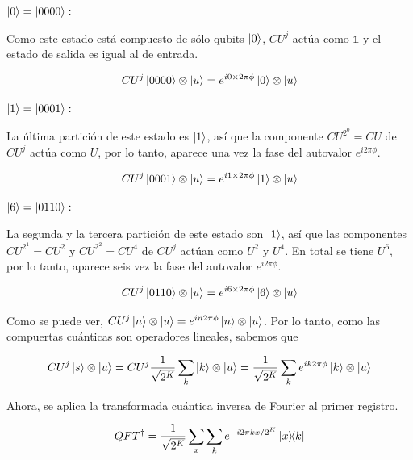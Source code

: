 $\ket{0} = \ket{0000}:$

Como este estado está compuesto de sólo qubits $\ket{0}$, $CU^j$ actúa como $\mathds{1}$ y el estado de salida es igual al de entrada.

\begin{equation}
    CU^j \ket{0000} \otimes \ket{u} = e^{i 0 \times 2\pi \phi} \ket{0} \otimes \ket{u}
\end{equation}

$\ket{1} = \ket{0001}:$

La última partición de este estado es $\ket{1}$, así que la componente $CU^{2^0} = CU$ de $CU^j$ actúa como $U$, por lo tanto, aparece una vez la fase del autovalor $e^{i 2\pi \phi}$.

\begin{equation}
    CU^j \ket{0001} \otimes \ket{u} = e^{i 1 \times 2\pi \phi} \ket{1} \otimes \ket{u}
\end{equation}

$\ket{6} = \ket{0110}:$

La segunda y la tercera partición de este estado son $\ket{1}$, así que las componentes $CU^{2^1} = CU^2$ y $CU^{2^2} = CU^4$ de $CU^j$ actúan como $U^2$ y $U^4$. En total se tiene $U^6$, por lo tanto, aparece seis vez la fase del autovalor $e^{i 2\pi \phi}$.

\begin{equation}
    CU^j \ket{0110} \otimes \ket{u} = e^{i 6 \times 2\pi \phi} \ket{6} \otimes \ket{u}
\end{equation}

Como se puede ver, $CU^j \ket{n} \otimes \ket{u} = e^{i n 2\pi \phi} \ket{n} \otimes \ket{u}$. Por lo tanto, como las compuertas cuánticas son operadores lineales, sabemos que

\begin{equation}
    CU^j \ket{s} \otimes \ket{u} = CU^j \frac{1}{\sqrt{2^K}} \sum\limits_k \ket{k} \otimes \ket{u} = \frac{1}{\sqrt{2^K}} \sum\limits_k e^{i k 2\pi \phi} \ket{k} \otimes \ket{u}
\end{equation}

Ahora, se aplica la transformada cuántica inversa de Fourier al primer registro.

\begin{equation}
    QFT^\dagger = \frac{1}{\sqrt{2^K}} \sum\limits_x\sum\limits_k e^{-i 2\pi k x / 2^K} \ketbra{x}{k}
\end{equation}

